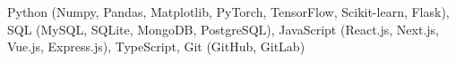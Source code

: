 \vspace{5pt}\item{
    Python (Numpy, Pandas, Matplotlib, PyTorch, TensorFlow, Scikit-learn, Flask),
    SQL (MySQL, SQLite, MongoDB, PostgreSQL),
    JavaScript (React.js, Next.js, Vue.js, Express.js),
    TypeScript,
    Git (GitHub, GitLab)
}
